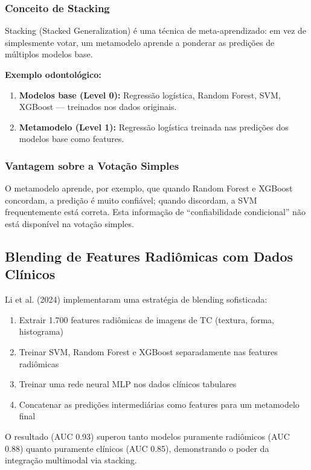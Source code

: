 \subsubsection{Conceito de Stacking}

Stacking (Stacked Generalization)  é uma técnica de meta-aprendizado: em vez de simplesmente votar, um metamodelo aprende a ponderar as predições de múltiplos modelos base.

\textbf{Exemplo odontológico:}
\begin{enumerate}
    \item \textbf{Modelos base (Level 0):} Regressão logística, Random Forest, SVM, XGBoost — treinados nos dados originais.
    \item \textbf{Metamodelo (Level 1):} Regressão logística treinada nas predições dos modelos base como features.
\end{enumerate}

\subsubsection{Vantagem sobre a Votação Simples}

O metamodelo aprende, por exemplo, que quando Random Forest e XGBoost concordam, a predição é muito confiável; quando discordam, a SVM frequentemente está correta. Esta informação de ``confiabilidade condicional'' não está disponível na votação simples.

\subsection{Blending de Features Radiômicas com Dados Clínicos}

Li et al. (2024) \cite{ODT-028} implementaram uma estratégia de blending sofisticada:

\begin{enumerate}
    \item Extrair 1.700 features radiômicas de imagens de TC (textura, forma, histograma)
    \item Treinar SVM, Random Forest e XGBoost separadamente nas features radiômicas
    \item Treinar uma rede neural MLP nos dados clínicos tabulares
    \item Concatenar as predições intermediárias como features para um metamodelo final
\end{enumerate}

O resultado (AUC 0.93) superou tanto modelos puramente radiômicos (AUC 0.88) quanto puramente clínicos (AUC 0.85), demonstrando o poder da integração multimodal via stacking.

